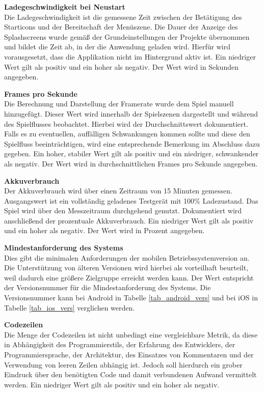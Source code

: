 \bigskip
\textbf{Ladegeschwindigkeit bei Neustart} \\
Die Ladegeschwindigkeit ist die gemessene Zeit zwischen der Betätigung des Starticons und der Bereitschaft der Menüszene. Die Dauer der Anzeige des Splashscreens wurde gemäß der Grundeinstellungen der Projekte übernommen und bildet die Zeit ab, in der die Anwendung geladen wird. Hierfür wird vorausgesetzt, dass die Applikation nicht im Hintergrund aktiv ist. Ein niedriger Wert gilt als positiv und ein hoher als negativ. Der Wert wird in Sekunden angegeben.

\bigskip
\textbf{Frames pro Sekunde} \\
Die Berechnung und Darstellung der Framerate wurde dem Spiel manuell hinzugefügt. Dieser Wert wird innerhalb der Spielszenen dargestellt und während des Spielflusses beobachtet. Hierbei wird der Durchschnittswert dokumentiert. Falls es zu eventuellen, auffälligen Schwankungen kommen sollte und diese den Spielfluss beeinträchtigen, wird eine entsprechende Bemerkung im Abschluss dazu gegeben. Ein hoher, stabiler Wert gilt als positiv und ein niedriger, schwankender als negativ. Der Wert wird in durchschnittlichen Frames pro Sekunde angegeben.

\bigskip
\textbf{Akkuverbrauch} \\
Der Akkuverbrauch wird über einen Zeitraum von 15 Minuten gemessen. Ausgangswert ist ein vollständig geladenes Testgerät mit 100\% Ladezustand. Das Spiel wird über den Messzeitraum durchgehend genutzt. Dokumentiert wird anschließend der prozentuale Akkuverbrauch. Ein niedriger Wert gilt als positiv und ein hoher als negativ. Der Wert wird in Prozent angegeben.

\bigskip
\textbf{Mindestanforderung des Systems} \\
Dies gibt die minimalen Anforderungen der mobilen Betriebssystemversion an. Die Unterstützung von älteren Versionen wird hierbei als vorteilhaft beurteilt, weil dadurch eine größere Zielgruppe erreicht werden kann. Der Wert entspricht der Versionsnummer für die Mindestanforderung des Systems. Die Versionsnummer kann bei Android in Tabelle \ref{tab_android_vers} und bei iOS in Tabelle \ref{tab_ios_vers} verglichen werden.

\bigskip
\textbf{Codezeilen} \\
Die Menge der Codezeilen ist nicht unbedingt eine vergleichbare Metrik, da diese in Abhängigkeit des Programmierstils, der Erfahrung des Entwicklers, der Programmiersprache, der Architektur, des Einsatzes von Kommentaren und der Verwendung von leeren Zeilen abhängig ist. Jedoch soll hierdurch ein grober Eindruck über den benötigten Code und damit verbundenen Aufwand vermittelt werden. Ein niedriger Wert gilt als positiv und ein hoher als negativ.


